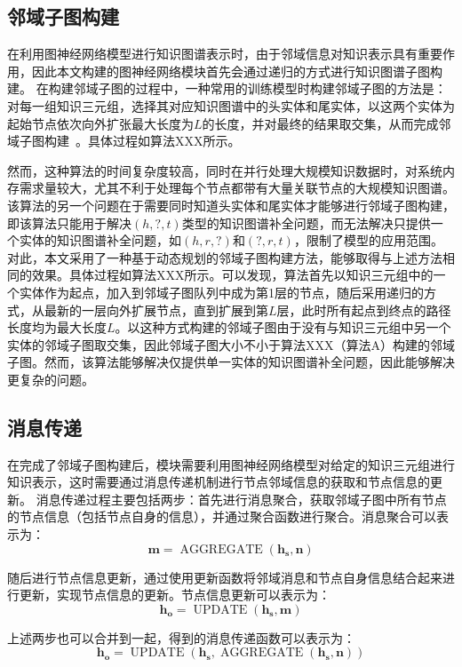\documentclass[algorithmlist, AutoFakeBold, AutoFakeSlant, figurelist, tablelist, nomlist, masters]{seuthesix}
\begin{document}
\subsection{邻域子图构建}
在利用图神经网络模型进行知识图谱表示时，由于邻域信息对知识表示具有重要作用，因此本文构建的图神经网络模块首先会通过递归的方式进行知识图谱子图构建。
在构建邻域子图的过程中，一种常用的训练模型时构建邻域子图的方法是：对每一组知识三元组，选择其对应知识图谱中的头实体和尾实体，以这两个实体为起始节点依次向外扩张最大长度为$L$的长度，并对最终的结果取交集，从而完成邻域子图构建~\cite{teru2020inductive}。具体过程如算法XXX所示。

然而，这种算法的时间复杂度较高，同时在并行处理大规模知识数据时，对系统内存需求量较大，尤其不利于处理每个节点都带有大量关联节点的大规模知识图谱。该算法的另一个问题在于需要同时知道头实体和尾实体才能够进行邻域子图构建，即该算法只能用于解决$(h, ?, t)$类型的知识图谱补全问题，而无法解决只提供一个实体的知识图谱补全问题，如$(h, r, ?)$和$(?, r, t)$，限制了模型的应用范围。
对此，本文采用了一种基于动态规划的邻域子图构建方法，能够取得与上述方法相同的效果。具体过程如算法XXX所示。可以发现，算法首先以知识三元组中的一个实体作为起点，加入到邻域子图队列中成为第1层的节点，随后采用递归的方式，从最新的一层向外扩展节点，直到扩展到第$L$层，此时所有起点到终点的路径长度均为最大长度$L$。以这种方式构建的邻域子图由于没有与知识三元组中另一个实体的邻域子图取交集，因此邻域子图大小不小于算法XXX（算法A）构建的邻域子图。然而，该算法能够解决仅提供单一实体的知识图谱补全问题，因此能够解决更复杂的问题。

\subsection{消息传递}
在完成了邻域子图构建后，模块需要利用图神经网络模型对给定的知识三元组进行知识表示，这时需要通过消息传递机制进行节点邻域信息的获取和节点信息的更新。
消息传递过程主要包括两步：首先进行消息聚合，获取邻域子图中所有节点的节点信息（包括节点自身的信息），并通过聚合函数进行聚合。消息聚合可以表示为：
\begin{equation}
  \bm{m} = \operatorname{AGGREGATE}(\bm{h_s}, \bm{n})
\end{equation}

随后进行节点信息更新，通过使用更新函数将邻域消息和节点自身信息结合起来进行更新，实现节点信息的更新。节点信息更新可以表示为：
\begin{equation}
  \bm{h_o} = \operatorname{UPDATE}(\bm{h_s}, \bm{m})
\end{equation}

上述两步也可以合并到一起，得到的消息传递函数可以表示为：
\begin{equation}
  \bm{h_o} = \operatorname{UPDATE}(\bm{h_s}, \operatorname{AGGREGATE}(\bm{h_s}, \bm{n}))
  \label{equation_MessagePassing}
\end{equation}
\end{document}
